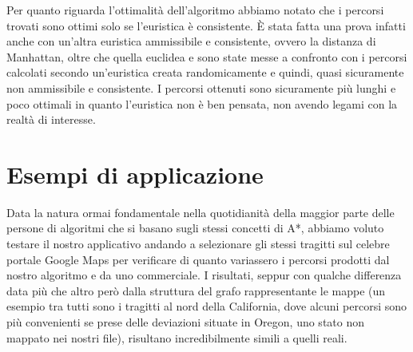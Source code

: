 \documentclass[12pt,a4paper]{report}
\begin{document}
Per quanto riguarda l'ottimalità dell'algoritmo abbiamo notato che i percorsi trovati sono ottimi solo se l'euristica è consistente. È stata fatta una prova infatti anche con un'altra euristica ammissibile e consistente, ovvero la distanza di Manhattan, oltre che quella euclidea e sono state messe a confronto con i percorsi calcolati secondo un'euristica creata randomicamente e quindi, quasi sicuramente non ammissibile e consistente.
I percorsi ottenuti sono sicuramente più lunghi e poco ottimali in quanto l'euristica non è ben pensata, non avendo legami con la realtà di interesse. 

\chapter{Esempi di applicazione}

Data la natura ormai fondamentale nella quotidianità della maggior parte delle persone di algoritmi che si basano sugli stessi concetti di A*, abbiamo voluto testare il nostro applicativo andando a selezionare gli stessi tragitti sul celebre portale Google Maps per verificare di quanto variassero i percorsi prodotti dal nostro algoritmo e da uno commerciale. I risultati, seppur con qualche differenza data più che altro però dalla struttura del grafo rappresentante le mappe (un esempio tra tutti sono i tragitti al nord della California, dove alcuni percorsi sono più convenienti se prese delle deviazioni situate in Oregon, uno stato non mappato nei nostri file), risultano incredibilmente simili a quelli reali.
\end{document}
